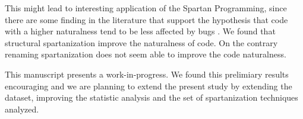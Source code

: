 This might lead to interesting application of the Spartan Programming, since 
there are some finding in the literature that support the hypothesis that code 
with a higher naturalness tend to be less affected by bugs 
\cite{Hindle:Bar:Su:Gabel:Devanbu:12}.
We found that structural spartanization improve the naturalness of code. 
On the contrary renaming spartanization does not seem able to improve the code naturalness.

This manuscript presents a work-in-progress. 
We found this prelimiary results encouraging and 
we are planning to extend the present study by extending the dataset, improving the 
statistic analysis and the set of spartanization techniques analyzed. 

% 
% 

